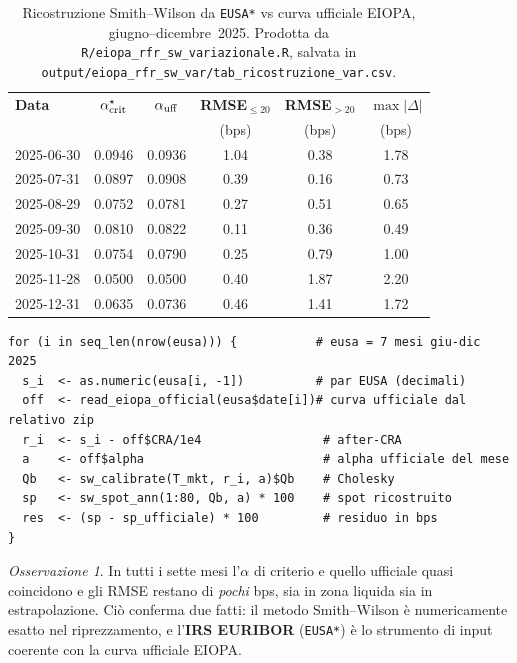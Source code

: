 \documentclass[11pt,a4paper]{article}
\theoremstyle{plain}
\theoremstyle{definition}
\theoremstyle{remark}
\newtheorem*{osservazione}{Osservazione}
\begin{document}
\begin{table}[H]
\centering\small
\caption{Ricostruzione Smith--Wilson da \texttt{EUSA*} vs curva ufficiale EIOPA, giugno--dicembre~2025.
Prodotta da \texttt{R/eiopa\_rfr\_sw\_variazionale.R}, salvata in
\texttt{output/eiopa\_rfr\_sw\_var/tab\_ricostruzione\_var.csv}.}
\label{tab:rmse}
\renewcommand{\arraystretch}{1.2}
\begin{tabular}{lccccc}
\toprule
\textbf{Data} & $\alpha^\star_{\rm crit}$ & $\alpha_{\rm uff}$ &
\textbf{RMSE}$_{\le 20}$ & \textbf{RMSE}$_{>20}$ & $\max|\Delta|$\\
 & & & (bps) & (bps) & (bps)\\
\midrule
\rowcolor{blue!4}2025-06-30 & 0.0946 & 0.0936 & 1.04 & 0.38 & 1.78\\
2025-07-31 & 0.0897 & 0.0908 & 0.39 & 0.16 & 0.73\\
\rowcolor{blue!4}2025-08-29 & 0.0752 & 0.0781 & 0.27 & 0.51 & 0.65\\
2025-09-30 & 0.0810 & 0.0822 & 0.11 & 0.36 & 0.49\\
\rowcolor{blue!4}2025-10-31 & 0.0754 & 0.0790 & 0.25 & 0.79 & 1.00\\
2025-11-28 & 0.0500 & 0.0500 & 0.40 & 1.87 & 2.20\\
\rowcolor{blue!4}2025-12-31 & 0.0635 & 0.0736 & 0.46 & 1.41 & 1.72\\
\bottomrule
\end{tabular}
\end{table}

\begin{codebox}
\begin{Verbatim}[fontsize=\small]
for (i in seq_len(nrow(eusa))) {           # eusa = 7 mesi giu-dic 2025
  s_i  <- as.numeric(eusa[i, -1])          # par EUSA (decimali)
  off  <- read_eiopa_official(eusa$date[i])# curva ufficiale dal relativo zip
  r_i  <- s_i - off$CRA/1e4                 # after-CRA
  a    <- off$alpha                         # alpha ufficiale del mese
  Qb   <- sw_calibrate(T_mkt, r_i, a)$Qb    # Cholesky
  sp   <- sw_spot_ann(1:80, Qb, a) * 100    # spot ricostruito
  res  <- (sp - sp_ufficiale) * 100         # residuo in bps
}
\end{Verbatim}
\end{codebox}

\begin{osservazione}
In tutti i sette mesi l'$\alpha$ di criterio e quello ufficiale quasi coincidono e gli RMSE
restano di \emph{pochi} bps, sia in zona liquida sia in estrapolazione. Ci\`o conferma due
fatti: il metodo Smith--Wilson \`e numericamente esatto nel riprezzamento, e l'\textbf{IRS
EURIBOR} (\texttt{EUSA*}) \`e lo strumento di input coerente con la curva ufficiale EIOPA.
\end{osservazione}
\end{document}

